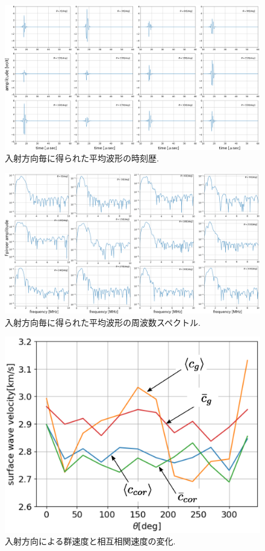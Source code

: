 \begin{figure}[h]
	\begin{center}
	\includegraphics[width=1.0\linewidth]{Figs/fig11_1.eps} 
	\end{center}
	\caption{
		入射方向毎に得られた平均波形の時刻歴.
	} 
	\label{fig:fig11_1}
\end{figure}
\begin{figure}[h]
	\begin{center}
	\includegraphics[width=1.0\linewidth]{Figs/fig11_2.eps} 
	\end{center}
	\caption{
		入射方向毎に得られた平均波形の周波数スペクトル.
	} 
	\label{fig:fig11_2}
\end{figure}
\begin{figure}[h]
	\begin{center}
	\includegraphics[width=0.8\linewidth]{Figs/fig12.eps} 
	\end{center}
	\caption{
		入射方向による群速度と相互相関速度の変化.
	} 
	\label{fig:fig12}
\end{figure}
